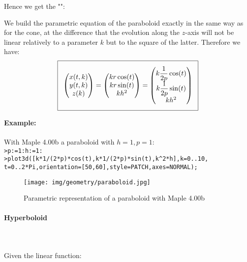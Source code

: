 {	Hence we get the "":
	
	We build the parametric equation of the paraboloid exactly in the same way as for the cone, at the difference that the evolution along the $z$-axis will not be linear relatively to a parameter $k$ but to the square of the latter. Therefore we have:
	\begin{equation}
	  \addtolength{\fboxsep}{5pt}
	   \boxed{
	   \begin{gathered}
	   		\begin{pmatrix}
	   		x(t,k)\\y(t,k)\\z(k)
	   		\end{pmatrix}=
	   		\begin{pmatrix}
	   		kr\cos(t)\\kr\sin(t)\\kh^2
	   		\end{pmatrix}=
	   		\begin{pmatrix}
	   		k\dfrac{1}{2p}\cos(t)\\k\dfrac{1}{2p}\sin(t)\\kh^2
	   		\end{pmatrix}
	   \end{gathered}
	   }
	\end{equation}
	\begin{tcolorbox}[colframe=black,colback=white,sharp corners]
	\textbf{{\Large {}}Example:}\\\\
	With Maple 4.00b a paraboloid with $h=1,p=1$:\\

	\texttt{>p:=1:h:=1:\\
	>plot3d([k*1/(2*p)*cos(t),k*1/(2*p)*sin(t),k\string^2*h],k=0..10,\\
	t=0..2*Pi,orientation=[50,60],style=PATCH,axes=NORMAL); 
	}
	\begin{figure}[H]
		\centering
		\texttt{[image: img/geometry/paraboloid.jpg]}
		\caption{Parametric representation of a paraboloid with Maple 4.00b}
	\end{figure}
	\end{tcolorbox}
	
	\pagebreak
	\paragraph{Hyperboloid}\mbox{}\\\\
	Given the linear function:
	
}
